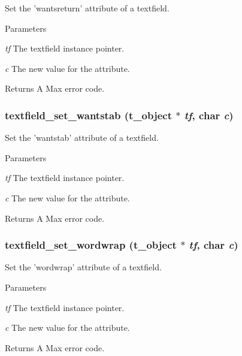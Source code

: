 Set the 'wantsreturn' attribute of a textfield. 
\begin{DoxyParams}{Parameters}
\item[{\em tf}]The textfield instance pointer. \item[{\em c}]The new value for the attribute. \end{DoxyParams}
\begin{DoxyReturn}{Returns}
A Max error code. 
\end{DoxyReturn}
\hypertarget{group__textfield_ga1c00dfa29cb591e2d97cdabd6a583cc3}{
\subsubsection[{textfield\_\-set\_\-wantstab}]{ textfield\_\-set\_\-wantstab ({\bf t\_\-object} $\ast$ {\em tf}, \/  char {\em c})}}
\label{group__textfield_ga1c00dfa29cb591e2d97cdabd6a583cc3}


Set the 'wantstab' attribute of a textfield. 
\begin{DoxyParams}{Parameters}
\item[{\em tf}]The textfield instance pointer. \item[{\em c}]The new value for the attribute. \end{DoxyParams}
\begin{DoxyReturn}{Returns}
A Max error code. 
\end{DoxyReturn}
\hypertarget{group__textfield_ga4777e4c3fc3b1c5aa7ddc319e5b2ed8e}{
\subsubsection[{textfield\_\-set\_\-wordwrap}]{ textfield\_\-set\_\-wordwrap ({\bf t\_\-object} $\ast$ {\em tf}, \/  char {\em c})}}
\label{group__textfield_ga4777e4c3fc3b1c5aa7ddc319e5b2ed8e}


Set the 'wordwrap' attribute of a textfield. 
\begin{DoxyParams}{Parameters}
\item[{\em tf}]The textfield instance pointer. \item[{\em c}]The new value for the attribute. \end{DoxyParams}
\begin{DoxyReturn}{Returns}
A Max error code. 
\end{DoxyReturn}
